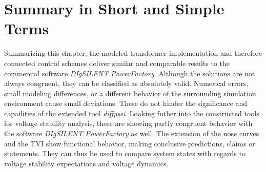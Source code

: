\section{Summary in Short and Simple Terms}

Summarizing this chapter, the modeled transformer implementation and therefore connected control schemes deliver similar and comparable results to the commercial software \textit{DIgSILENT PowerFactory}.
Although the solutions are not always congruent, they can be classified as absolutely valid.
Numerical errors, small modeling differences, or a different behavior of the surrounding simulation environment cause small deviations.
These do not hinder the significance and capailities of the extended tool \textit{diffpssi}.
Looking futher into the constructed tools for voltage stability analysis, these are showing partly congruent behavior with the software \textit{DIgSILENT PowerFactory} as well.
The extension of the nose curves and the \acs{TVI} show functional behavior, making conclusive predictions, claims or statements.
They can thus be used to compare system states with regards to voltage stability expectations and voltage dynamics.